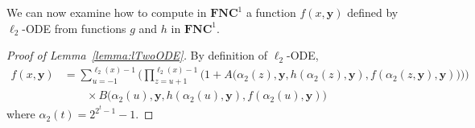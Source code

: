 \documentclass[11pt, oneside]{article}
\newcommand{\NC}{\mathbf{FNC}}
\newcommand{\tu}[1]{\mathbf{#1}}
\theoremstyle{definition}
\begin{document}
\begin{toappendix}








We can now examine how to compute in $\NC^1$ a function $f(x, \tu y)$ defined by $\ell_2$-ODE from functions $g$ and $h$ in $\NC^1$.

\begin{proof}[Proof of Lemma~\ref{lemma:lTwoODE}]
    By definition of $\ell_2$-ODE,
    \begin{align*}
        f(x, \tu y) &= \sum^{\ell_2(x)-1}_{u=-1} \Bigg(\prod^{\ell_2(x)-1}_{z=u+1} \bigg(1+A\big(\alpha_2(z), \tu y, h(\alpha_2(z), \tu y), f(\alpha_2(z,\tu y),\tu y)\big)\bigg)\Bigg) \\
        & \quad \quad \times B\big(\alpha_2(u), \tu y, h(\alpha_2(u), \tu y), f(\alpha_2(u), \tu y)\big)
    \end{align*}
    where $\alpha_2(t)=2^{2^t-1}-1$.


\end{proof}
\end{toappendix}
\end{document}
